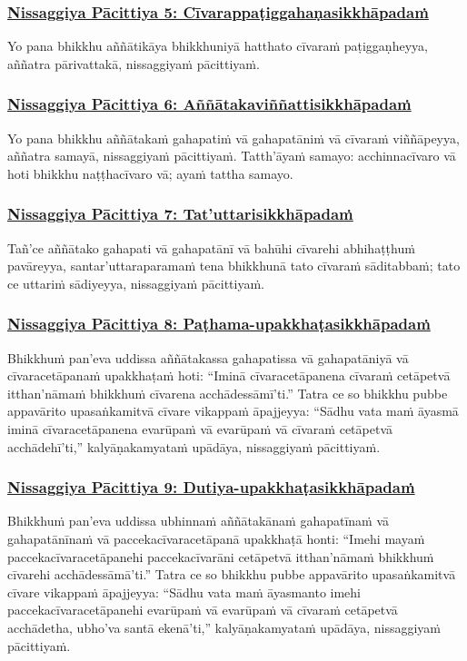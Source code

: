 \subsubsection*{\hyperref[forf-exp5]{Nissaggiya Pācittiya 5: Cīvarappaṭiggahaṇasikkhāpadaṁ}}
\label{np5}
Yo pana bhikkhu aññātikāya bhikkhuniyā hatthato cīvaraṁ paṭiggaṇheyya, aññatra pārivattakā, nissaggiyaṁ pācittiyaṁ.

\subsubsection*{\hyperref[forf-exp6]{Nissaggiya Pācittiya 6: Aññātakaviññattisikkhāpadaṁ}}
\label{np6}
Yo pana bhikkhu aññātakaṁ gahapatiṁ vā gahapatāniṁ vā cīvaraṁ viññāpeyya, aññatra samayā, nissaggiyaṁ pācittiyaṁ. Tatth'āyaṁ samayo: acchinnacīvaro vā hoti bhikkhu naṭṭhacīvaro vā; ayaṁ tattha samayo.

\subsubsection*{\hyperref[forf-exp7]{Nissaggiya Pācittiya 7: Tat'uttarisikkhāpadaṁ}}
\label{np7}
Tañ'ce aññātako gahapati vā gahapatānī vā bahūhi cīvarehi abhihaṭṭhuṁ pavāreyya, santar'uttaraparamaṁ tena bhikkhunā tato cīvaraṁ sāditabbaṁ; tato ce uttariṁ sādiyeyya, nissaggiyaṁ pācittiyaṁ.

\subsubsection*{\hyperref[forf-exp8]{Nissaggiya Pācittiya 8: Paṭhama-upakkhaṭasikkhāpadaṁ}}
\label{np8}
Bhikkhuṁ pan'eva uddissa aññātakassa gahapatissa vā gahapatāniyā vā cīvaracetāpanaṁ upakkhaṭaṁ hoti: ``Iminā cīvaracetāpanena cīvaraṁ cetāpetvā itthan'nāmaṁ bhikkhuṁ cīvarena acchādessāmī'ti.'' Tatra ce so bhikkhu pubbe appavārito upasaṅkamitvā cīvare vikappaṁ āpajjeyya: ``Sādhu vata maṁ āyasmā iminā cīvaracetāpanena evarūpaṁ vā evarūpaṁ vā cīvaraṁ cetāpetvā acchādehī'ti,'' kalyāṇakamyataṁ upādāya, nissaggiyaṁ pācittiyaṁ.

\subsubsection*{\hyperref[forf-exp9]{Nissaggiya Pācittiya 9: Dutiya-upakkhaṭasikkhāpadaṁ}}
\label{np9}
Bhikkhuṁ pan'eva uddissa ubhinnaṁ aññātakānaṁ gahapatīnaṁ vā gahapatānīnaṁ vā paccekacīvaracetāpanā upakkhaṭā honti: ``Imehi mayaṁ paccekacīvaracetāpanehi paccekacīvarāni cetāpetvā itthan'nāmaṁ bhikkhuṁ cīvarehi acchādessāmā'ti.'' Tatra ce so bhikkhu pubbe appavārito upasaṅkamitvā cīvare vikappaṁ āpajjeyya: ``Sādhu vata maṁ āyasmanto imehi paccekacīvaracetāpanehi evarūpaṁ vā evarūpaṁ vā cīvaraṁ cetāpetvā acchādetha, ubho'va santā ekenā'ti,'' kalyāṇakamyataṁ upādāya, nissaggiyaṁ pācittiyaṁ.

